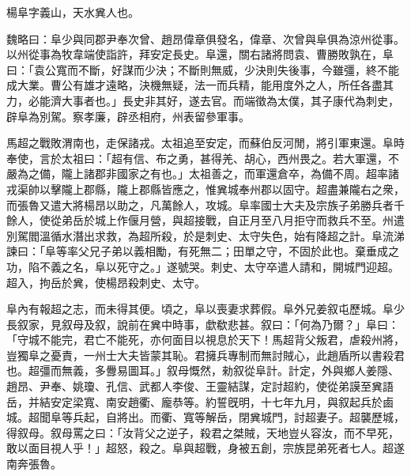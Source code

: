 
\begin{pinyinscope}
楊阜字義山，天水兾人也。

魏略曰：阜少與同郡尹奉次曾、趙昂偉章俱發名，偉章、次曾與阜俱為涼州從事。以州從事為牧韋端使詣許，拜安定長史。阜還，關右諸將問袁、曹勝敗孰在，阜曰：「袁公寬而不斷，好謀而少決；不斷則無威，少決則失後事，今雖彊，終不能成大業。曹公有雄才遠略，決機無疑，法一而兵精，能用度外之人，所任各盡其力，必能濟大事者也。」長史非其好，遂去官。而端徵為太僕，其子康代為刺史，辟阜為別駕。察孝廉，辟丞相府，州表留參軍事。

馬超之戰敗渭南也，走保諸戎。太祖追至安定，而蘇伯反河閒，將引軍東還。阜時奉使，言於太祖曰：「超有信、布之勇，甚得羌、胡心，西州畏之。若大軍還，不嚴為之備，隴上諸郡非國家之有也。」太祖善之，而軍還倉卒，為備不周。超率諸戎渠帥以擊隴上郡縣，隴上郡縣皆應之，惟兾城奉州郡以固守。超盡兼隴右之衆，而張魯又遣大將楊昂以助之，凡萬餘人，攻城。阜率國士大夫及宗族子弟勝兵者千餘人，使從弟岳於城上作偃月營，與超接戰，自正月至八月拒守而救兵不至。州遣別駕閻溫循水潛出求救，為超所殺，於是刺史、太守失色，始有降超之計。阜流涕諫曰：「阜等率父兄子弟以義相勵，有死無二；田單之守，不固於此也。棄垂成之功，陷不義之名，阜以死守之。」遂號哭。刺史、太守卒遣人請和，開城門迎超。超入，拘岳於兾，使楊昂殺刺史、太守。

阜內有報超之志，而未得其便。頃之，阜以喪妻求葬假。阜外兄姜叙屯歷城。阜少長叙家，見叙母及叙，說前在兾中時事，歔欷悲甚。叙曰：「何為乃爾？」阜曰：「守城不能完，君亡不能死，亦何面目以視息於天下！馬超背父叛君，虐殺州將，豈獨阜之憂責，一州士大夫皆蒙其恥。君擁兵專制而無討賊心，此趙盾所以書殺君也。超彊而無義，多釁易圖耳。」叙母慨然，勑叙從阜計。計定，外與鄉人姜隱、趙昂、尹奉、姚瓊、孔信、武都人李俊、王靈結謀，定討超約，使從弟謨至兾語岳，并結安定梁寬、南安趙衢、龐恭等。約誓旣明，十七年九月，與叙起兵於鹵城。超聞阜等兵起，自將出。而衢、寬等解岳，閉兾城門，討超妻子。超襲歷城，得叙母。叙母罵之曰：「汝背父之逆子，殺君之桀賊，天地豈乆容汝，而不早死，敢以面目視人乎！」超怒，殺之。阜與超戰，身被五創，宗族昆弟死者七人。超遂南奔張魯。


\end{pinyinscope}
